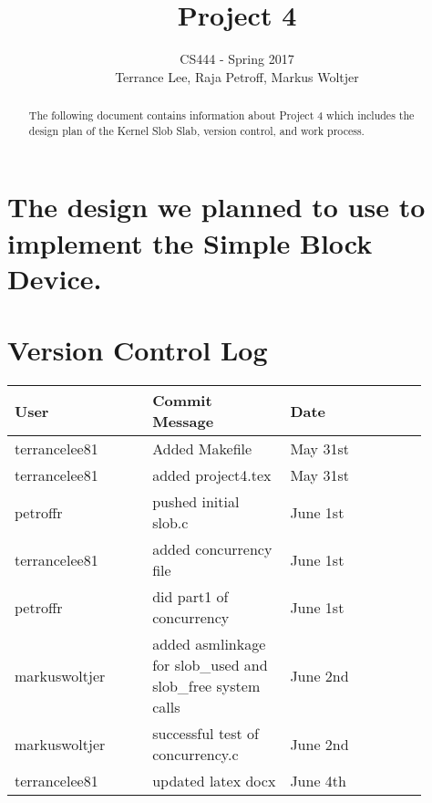 \documentclass[draftclsnofoot,onecolumn,10pt,compsoc]{IEEEtran}
\begin{document}
\begin{titlepage}
	\title{Project 4}
	\author{CS444 - Spring 2017 \\ Terrance Lee, Raja Petroff, Markus Woltjer}
	\maketitle
	\begin{abstract}
		The following document contains information about Project 4 which includes the design plan of the Kernel Slob Slab, version control, and work process.  
	\end{abstract}
	
	\thispagestyle{empty} %
	
\end{titlepage}

\tableofcontents

\newpage

\section{The design we planned to use to implement the Simple Block Device.}
\section{Version Control Log}
\begin{center}
	\begin{tabular}{| p{0.3\linewidth} | p{0.3\linewidth} | p{0.3\linewidth} |}
		\hline User & Commit Message & Date\\
		\hline terrancelee81 & Added Makefile & May 31st\\
		\hline terrancelee81 & added project4.tex& May 31st\\
		\hline petroffr & pushed initial slob.c & June 1st \\ 	
		\hline terrancelee81 & added concurrency file & June 1st\\
		\hline petroffr & did part1 of concurrency & June 1st\\
		\hline markuswoltjer & added asmlinkage for slob_used and slob_free system calls & June 2nd\\
		\hline markuswoltjer & successful test of concurrency.c & June 2nd\\
		\hline terrancelee81 & updated latex docx & June 4th\\
	\end{tabular}
\end{center}
\end{document}
